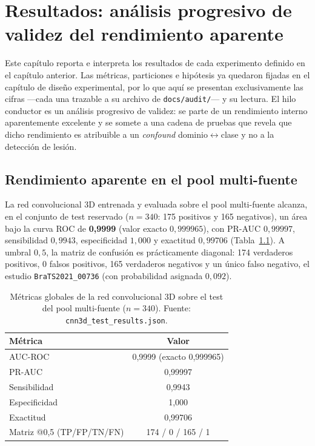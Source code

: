 \chapter{Resultados: análisis progresivo de validez del rendimiento aparente}
\renewcommand{\currentchapter}{Resultados}

Este capítulo reporta e interpreta los resultados de cada experimento definido
en el capítulo anterior. Las métricas, particiones e hipótesis ya quedaron
fijadas en el capítulo de diseño experimental, por lo que aquí se presentan
exclusivamente las cifras ---cada una trazable a su archivo de
\texttt{docs/audit/}--- y su lectura. El hilo conductor es un análisis
progresivo de validez: se parte de un rendimiento interno aparentemente
excelente y se somete a una cadena de pruebas que revela que dicho rendimiento
es atribuible a un \emph{confound} dominio$\leftrightarrow$clase y no a la
detección de lesión.

\section{Rendimiento aparente en el pool multi-fuente}

La red convolucional 3D entrenada y evaluada sobre el pool multi-fuente alcanza,
en el conjunto de test reservado ($n=340$: 175 positivos y 165 negativos), un
área bajo la curva ROC de \textbf{0,9999} (valor exacto $0{,}999965$), con
PR-AUC $0{,}99997$, sensibilidad $0{,}9943$, especificidad $1{,}000$ y exactitud
$0{,}99706$ (Tabla~\ref{tab:pool_global}). A umbral $0{,}5$, la matriz de
confusión es prácticamente diagonal: 174 verdaderos positivos, 0 falsos
positivos, 165 verdaderos negativos y un único falso negativo, el estudio
\texttt{BraTS2021\_00736} (con probabilidad asignada $0{,}092$).

\begin{table}[ht]
  \centering
  \caption[Rendimiento global de la CNN en el pool]{Métricas globales de la red
  convolucional 3D sobre el test del pool multi-fuente ($n=340$). Fuente:
  \texttt{cnn3d\_test\_results.json}.}
  \label{tab:pool_global}
  \begin{tabular}{l c}
    \hline
    \textbf{Métrica} & \textbf{Valor} \\
    \hline
    AUC-ROC                 & 0,9999 (exacto 0,999965) \\
    PR-AUC                  & 0,99997 \\
    Sensibilidad            & 0,9943 \\
    Especificidad           & 1,000 \\
    Exactitud               & 0,99706 \\
    Matriz @0,5 (TP/FP/TN/FN) & 174 / 0 / 165 / 1 \\
    \hline
  \end{tabular}
\end{table}

